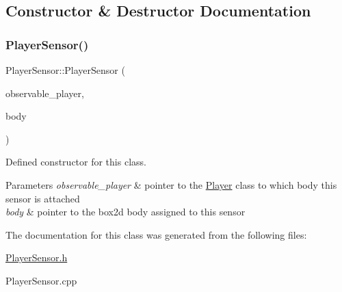 \subsection{Constructor \& Destructor Documentation}
\mbox{\label{class_player_sensor_a1e74f6ad656f4cdc6449fc55b41dff42}} 
\subsubsection{\texorpdfstring{Player\+Sensor()}{PlayerSensor()}}
{\footnotesize\ttfamily Player\+Sensor\+::\+Player\+Sensor (\begin{DoxyParamCaption}\item[{\hyperlink{class_player}{Player} $\ast$}]{observable\+\_\+player,  }\item[{b2\+Body $\ast$}]{body }\end{DoxyParamCaption})}



Defined constructor for this class. 


\begin{DoxyParams}{Parameters}
{\em observable\+\_\+player} & pointer to the \hyperlink{class_player}{Player} class to which body this sensor is attached \\
\hline
{\em body} & pointer to the box2d body assigned to this sensor \\
\hline
\end{DoxyParams}


The documentation for this class was generated from the following files\+:\begin{DoxyCompactItemize}
\item 
\hyperlink{_player_sensor_8h}{Player\+Sensor.\+h}\item 
Player\+Sensor.\+cpp\end{DoxyCompactItemize}

